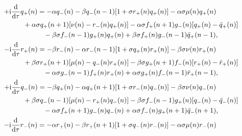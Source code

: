 \documentclass[10pt,a4paper]{amsart}
\numberwithin{equation}{section}
\begin{document}
\begin{gather}
	 +\mathrm{i}\frac{\mathrm{d}}{\mathrm{d}\tau}q_{+}(n) = - \alpha q_{-}(n) - \beta q_{-}(n-1)[1+\sigma r_{+}(n)q_{+}(n)] - \alpha\sigma\mu(n)q_{+}(n)\nonumber\\
 \hspace{0.25mm}\hphantom{+\mathrm{i}\frac{\mathrm{d}}{\mathrm{d}\tau}q_{+}(n) =}{}
	 +\alpha\sigma q_{+}(n+1)[\nu(n)-r_{-}(n)q_{+}(n)] - \alpha\sigma f_{+}(n+1)g_{-}(n)[q_{+}(n)-\bar{q}_{+}(n)]\nonumber\\
 \hspace{0.25mm}\hphantom{+\mathrm{i}\frac{\mathrm{d}}{\mathrm{d}\tau}q_{+}(n) =}{}
	 -\beta\sigma f_{-}(n-1)g_{+}(n)q_{+}(n) +\beta\sigma f_{+}(n)g_{-}(n-1)\bar{q}_{+}(n-1), \label{eq-6.1}
\\
	 -\mathrm{i}\frac{\mathrm{d}}{\mathrm{d}\tau}r_{+}(n) = -\beta r_{-}(n) - \alpha r_{-}(n-1)[1+\sigma q_{+}(n)r_{+}(n)] - \beta\sigma\nu(n)r_{+}(n)\nonumber\\
 \hspace{0.25mm}\hphantom{-\mathrm{i}\frac{\mathrm{d}}{\mathrm{d}\tau}r_{+}(n) =}{}
	 +\beta\sigma r_{+}(n+1)[\mu(n)-q_{-}(n)r_{+}(n)] - \beta\sigma g_{+}(n+1)f_{-}(n)[r_{+}(n)-\bar{r}_{+}(n)]\nonumber\\
 \hspace{0.25mm}\hphantom{-\mathrm{i}\frac{\mathrm{d}}{\mathrm{d}\tau}r_{+}(n) =}{}
	 -\alpha\sigma g_{-}(n-1)f_{+}(n)r_{+}(n) +\alpha\sigma g_{+}(n)f_{-}(n-1)\bar{r}_{+}(n-1), \label{eq-6.2}
\\
	 +\mathrm{i}\frac{\mathrm{d}}{\mathrm{d}\tau}q_{-}(n) = -\beta q_{+}(n) - \alpha q_{+}(n+1)[1+\sigma r_{-}(n)q_{-}(n)] - \beta\sigma\nu(n)q_{-}(n)\nonumber\\
 \hspace{0.25mm}\hphantom{+\mathrm{i}\frac{\mathrm{d}}{\mathrm{d}\tau}q_{-}(n) =}{}
	 +\beta\sigma q_{-}(n-1)[\mu(n)-r_{+}(n)q_{-}(n)] - \beta\sigma f_{-}(n-1)g_{+}(n)[q_{-}(n)-\bar{q}_{-}(n)]\nonumber\\
 \hspace{0.25mm}\hphantom{+\mathrm{i}\frac{\mathrm{d}}{\mathrm{d}\tau}q_{-}(n) =}{}
	 -\alpha\sigma f_{+}(n+1)g_{-}(n)q_{-}(n) +\alpha\sigma f_{-}(n)g_{+}(n+1)\bar{q}_{-}(n+1), \label{eq-6.3}
\\
	 -\mathrm{i}\frac{\mathrm{d}}{\mathrm{d}\tau}r_{-}(n) = -\alpha r_{+}(n) - \beta r_{+}(n+1)[1+\sigma q_{-}(n)r_{-}(n)] - \alpha\sigma\mu(n)r_{-}(n)\nonumber\\
 \hspace{0.25mm}\hphantom{-\mathrm{i}\frac{\mathrm{d}}{\mathrm{d}\tau}r_{-}(n) =}{}

\end{gather}
\end{document}
